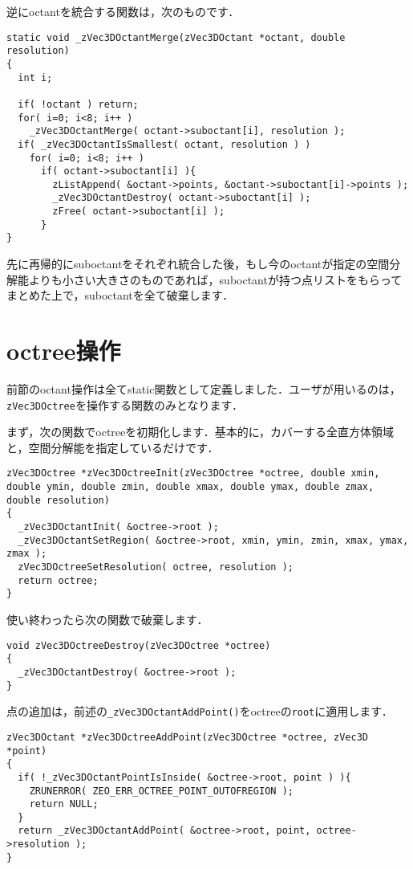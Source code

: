 ﻿\documentclass[a4paper]{jsarticle}
\begin{document}
逆にoctantを統合する関数は，次のものです．
\begin{screen}
\begin{verbatim}
static void _zVec3DOctantMerge(zVec3DOctant *octant, double resolution)
{
  int i;

  if( !octant ) return;
  for( i=0; i<8; i++ )
    _zVec3DOctantMerge( octant->suboctant[i], resolution );
  if( _zVec3DOctantIsSmallest( octant, resolution ) )
    for( i=0; i<8; i++ )
      if( octant->suboctant[i] ){
        zListAppend( &octant->points, &octant->suboctant[i]->points );
        _zVec3DOctantDestroy( octant->suboctant[i] );
        zFree( octant->suboctant[i] );
      }
}
\end{verbatim}
\end{screen}

先に再帰的にsuboctantをそれぞれ統合した後，もし今のoctantが指定の空間分解能よりも小さい大きさのものであれば，suboctantが持つ点リストをもらってまとめた上で，suboctantを全て破棄します．



\section{octree操作}

前節のoctant操作は全てstatic関数として定義しました．ユーザが用いるのは，\verb|zVec3DOctree|を操作する関数のみとなります．

まず，次の関数でoctreeを初期化します．基本的に，カバーする全直方体領域と，空間分解能を指定しているだけです．
\begin{screen}
\begin{verbatim}
zVec3DOctree *zVec3DOctreeInit(zVec3DOctree *octree, double xmin, double ymin, double zmin, double xmax, double ymax, double zmax, double resolution)
{
  _zVec3DOctantInit( &octree->root );
  _zVec3DOctantSetRegion( &octree->root, xmin, ymin, zmin, xmax, ymax, zmax );
  zVec3DOctreeSetResolution( octree, resolution );
  return octree;
}
\end{verbatim}
\end{screen}

使い終わったら次の関数で破棄します．
\begin{screen}
\begin{verbatim}
void zVec3DOctreeDestroy(zVec3DOctree *octree)
{
  _zVec3DOctantDestroy( &octree->root );
}
\end{verbatim}
\end{screen}

点の追加は，前述の\verb|_zVec3DOctantAddPoint()|をoctreeの\verb|root|に適用します．
\begin{screen}
\begin{verbatim}
zVec3DOctant *zVec3DOctreeAddPoint(zVec3DOctree *octree, zVec3D *point)
{
  if( !_zVec3DOctantPointIsInside( &octree->root, point ) ){
    ZRUNERROR( ZEO_ERR_OCTREE_POINT_OUTOFREGION );
    return NULL;
  }
  return _zVec3DOctantAddPoint( &octree->root, point, octree->resolution );
}
\end{verbatim}
\end{screen}
\end{document}
